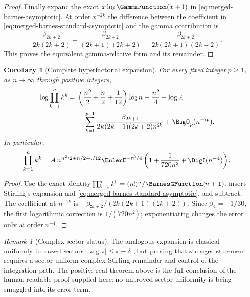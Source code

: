 \documentclass[11pt,a4paper,oneside,openany]{book}
\newtheorem{corollary}[theorem]{Corollary}
\theoremstyle{definition}
\theoremstyle{remark}
\newtheorem{remark}[theorem]{Remark}
\begin{document}
\begin{proof}
Finally expand the exact $x\log\GammaFunction(x+1)$ in
\eqref{eq:merged-barnes-asymptotic}.  At order $x^{-2k}$ the difference
between the coefficient in
\eqref{eq:merged-barnes-standard-asymptotic} and the gamma contribution is
\[
 \frac{\beta_{2k+2}}{2k(2k+2)}
 -\frac{\beta_{2k+2}}{(2k+1)(2k+2)}
 =\frac{\beta_{2k+2}}{2k(2k+1)(2k+2)}.
\]
This proves the equivalent gamma-relative form and its remainder.
\end{proof}

\begin{corollary}[Complete hyperfactorial expansion]
\label{cor:merged-hyperfactorial-asymptotic}
For every fixed integer $p\geq1$, as $n\to\infty$ through positive integers,
\begin{align}
 \log\prod_{k=1}^n k^k
 ={}&\left(\frac{n^2}{2}+\frac n2+\frac1{12}\right)\log n
 -\frac{n^2}{4}+\log A                                             \notag\\
 &-\sum_{k=1}^{p-1}\frac{\beta_{2k+2}}
 {2k(2k+1)(2k+2)n^{2k}}+\BigO_p(n^{-2p}).                             \label{eq:merged-hyperfactorial-log-asymptotic}
\end{align}
In particular,
\begin{equation}
 \prod_{k=1}^n k^k
 =A\,n^{n^2/2+n/2+1/12}\EulerE^{-n^2/4}
 \left(1+\frac1{720n^2}+\BigO(n^{-4})\right).                         \label{eq:merged-hyperfactorial-asymptotic}
\end{equation}
\end{corollary}

\begin{proof}
Use the exact identity
$\prod_{k=1}^n k^k=(n!)^n/\BarnesGFunction(n+1)$, insert Stirling's expansion
and \eqref{eq:merged-barnes-standard-asymptotic}, and subtract.  The
coefficient at $n^{-2k}$ is
$-\beta_{2k+2}/(2k(2k+1)(2k+2))$.  Since
$\beta_4=-1/30$, the first logarithmic correction is $1/(720n^2)$;
exponentiating changes the error only at order $n^{-4}$.
\end{proof}

\begin{remark}[Complex-sector status]
The analogous expansion is classical uniformly in closed sectors
$|\arg z|\leq\pi-\delta$ \cite{NISTDLMF}, but proving that stronger statement
requires a sector-uniform complex Stirling remainder and control of the
integration path.  The positive-real theorem above is the full conclusion of
the human-readable proof supplied here; no unproved sector-uniformity is being
smuggled into its error term.
\end{remark}
\end{document}
